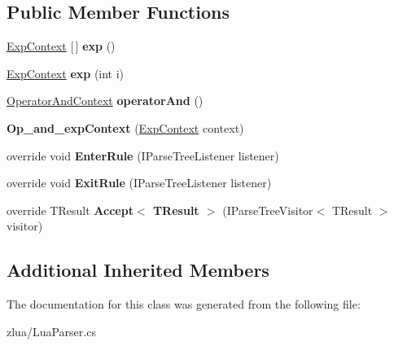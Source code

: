 \subsection*{Public Member Functions}
\begin{DoxyCompactItemize}
\item 
\mbox{\label{classzlua_1_1_lua_parser_1_1_op__and__exp_context_ae128fb1a9ca49075655e635a5316e70d}} 
\mbox{\hyperlink{classzlua_1_1_lua_parser_1_1_exp_context}{Exp\+Context}} \mbox{[}$\,$\mbox{]} {\bfseries exp} ()
\item 
\mbox{\label{classzlua_1_1_lua_parser_1_1_op__and__exp_context_ac03f3022af462cf4a7ad1d62865288c7}} 
\mbox{\hyperlink{classzlua_1_1_lua_parser_1_1_exp_context}{Exp\+Context}} {\bfseries exp} (int i)
\item 
\mbox{\label{classzlua_1_1_lua_parser_1_1_op__and__exp_context_ad7c33a8767ee92c50fee412140faf7c5}} 
\mbox{\hyperlink{classzlua_1_1_lua_parser_1_1_operator_and_context}{Operator\+And\+Context}} {\bfseries operator\+And} ()
\item 
\mbox{\label{classzlua_1_1_lua_parser_1_1_op__and__exp_context_a546e88c1d7829f504d576701c6ee30d2}} 
{\bfseries Op\+\_\+and\+\_\+exp\+Context} (\mbox{\hyperlink{classzlua_1_1_lua_parser_1_1_exp_context}{Exp\+Context}} context)
\item 
\mbox{\label{classzlua_1_1_lua_parser_1_1_op__and__exp_context_acb88800cff693367dc3e8e0d4e769ee5}} 
override void {\bfseries Enter\+Rule} (I\+Parse\+Tree\+Listener listener)
\item 
\mbox{\label{classzlua_1_1_lua_parser_1_1_op__and__exp_context_abc1fc8b0176f86cf347c9a1875b4ff3d}} 
override void {\bfseries Exit\+Rule} (I\+Parse\+Tree\+Listener listener)
\item 
\mbox{\label{classzlua_1_1_lua_parser_1_1_op__and__exp_context_abae04d6155b21369029c4d791f7f4eda}} 
override T\+Result {\bfseries Accept$<$ T\+Result $>$} (I\+Parse\+Tree\+Visitor$<$ T\+Result $>$ visitor)
\end{DoxyCompactItemize}
\subsection*{Additional Inherited Members}


The documentation for this class was generated from the following file\+:\begin{DoxyCompactItemize}
\item 
zlua/Lua\+Parser.\+cs\end{DoxyCompactItemize}
